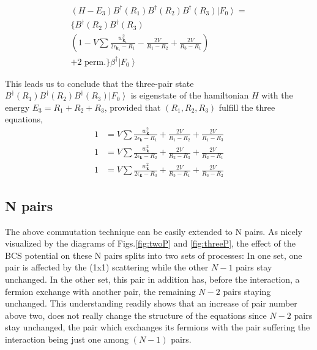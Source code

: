 \documentclass[aps,prb,superscriptaddress,showpacs,reprint,lengthcheck]{revtex4-1}
\begin{document}
\begin{multline}  \label{eq:SchThree4}
(H-E _3)B^{\dagger}(R_1)B^{\dagger}(R_2)B^{\dagger}(R_3)\left|F_0%
\right>  = \\
\{B^{\dagger}(R_2)B^{\dagger}(R_3) \\
\left(1-V\sum\frac{w_{\mathbf{k} _1}^2}{2\epsilon_{\mathbf{k} _1}-R_1}-\frac{2V%
}{R_1-R_2}+\frac{2V}{R_3-R_1}\right)  \\
+\text{2 perm.}\}\beta^{\dagger}\left|F_0\right>  
\end{multline}

This leads us to  conclude that the three-pair state $%
B^{\dagger}(R_1)B^{\dagger}(R_2)B^{\dagger}(R_3)\left|F_0\right>  $ is
eigenstate of the hamiltonian $H$ with the energy $E _3=R_1+R_2+R_3$,
provided that $\left(R_1,R_2, R_3\right) $ fulfill the three equations, 
\begin{equation}
\begin{split}
1&=V\sum\frac{w_{\mathbf{k} }^2}{2\epsilon_{\mathbf{k} }-R_1}+\frac{2V}{R_1-R_2%
}+\frac{2V}{R_1-R_3} \\
1&=V\sum\frac{w_{\mathbf{k} }^2}{2\epsilon_{\mathbf{k} }-R_2}+\frac{2V}{R_2-R_3%
}+\frac{2V}{R_2-R_1} \\
1&=V\sum\frac{w_{\mathbf{k} }^2}{2\epsilon_{\mathbf{k} }-R_3}+\frac{2V}{R_3-R_1%
}+\frac{2V}{R_3-R_2}
\end{split}%
\end{equation}

\subsection{N pairs}

The above commutation technique can be easily extended to N pairs. As nicely
visualized by the diagrams of Figs.\ref{fig:twoP} and \ref{fig:threeP}, the
effect of the BCS potential on these N pairs splits into two sets of processes:
In one set, one pair is affected by the (1x1) scattering while the other $N-1
$ pairs stay unchanged. In the other set, this pair in addition has, before the interaction, a fermion
exchange with another pair, the remaining $N-2$
pairs staying unchanged. This understanding readily shows that an increase of pair number above two, does not really change the structure of the equations
since $N-2$ pairs stay unchanged, the pair which exchanges its fermions with the
pair suffering the interaction being just one among $(N-1)$ pairs.
\end{document}
